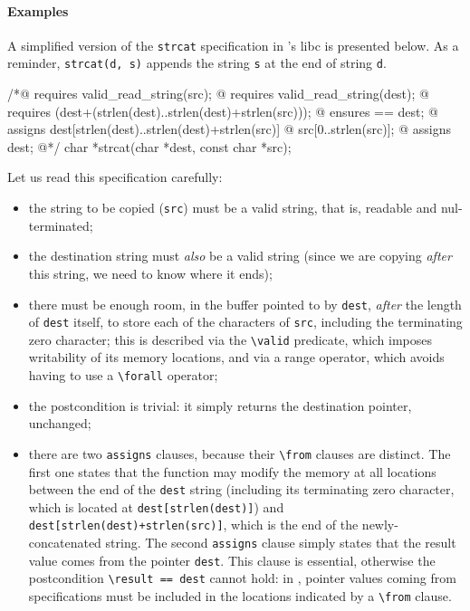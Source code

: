 \documentclass{frama-c-book}
\begin{document}
\paragraph{Examples}

A simplified version of the \texttt{strcat} specification in \FramaC's libc
is presented below. As a reminder, \verb+strcat(d, s)+ appends the string
\texttt{s} at the end of string \texttt{d}.

\begin{listing-nonumber}
/*@ requires valid_read_string(src);
  @ requires valid_read_string(dest);
  @ requires \valid(dest+(strlen(dest)..strlen(dest)+strlen(src)));
  @ ensures \result == dest;
  @ assigns dest[strlen(dest)..strlen(dest)+strlen(src)]
  @     \from src[0..strlen(src)];
  @ assigns \result \from dest;
  @*/
char *strcat(char *dest, const char *src);
\end{listing-nonumber}

Let us read this specification carefully:

\begin{itemize}
\item the string to be copied (\texttt{src}) must be a valid string,
  that is, readable and nul-terminated;
\item the destination string must {\em also} be a valid string
  (since we are copying {\em after} this string, we need to know where it ends);
\item there must be enough room, in the buffer pointed to by \texttt{dest},
  {\em after} the length of \texttt{dest} itself, to store each of the characters
  of \texttt{src}, including the terminating zero character;
  this is described via the \verb+\valid+ predicate,
  which imposes writability of its memory locations, and via a range operator,
  which avoids having to use a \verb+\forall+ operator;
\item the postcondition is trivial: it simply returns the destination pointer,
  unchanged;
\item there are two \texttt{assigns} clauses, because their \verb+\from+
  clauses are distinct. The first one states that the function may modify the
  memory at all locations between the end of the \texttt{dest} string
  (including its terminating zero character, which is located at
  \verb+dest[strlen(dest)]+) and \verb|dest[strlen(dest)+strlen(src)]|, which
  is the end of the newly-concatenated string.
  The second \texttt{assigns} clause simply states that the result value comes
  from the pointer \texttt{dest}. This clause is essential, otherwise the
  postcondition \verb+\result == dest+ cannot hold: in \Eva{}, pointer values
  coming from specifications must be included in the locations indicated by
  a \verb+\from+ clause.
\end{itemize}
\end{document}
